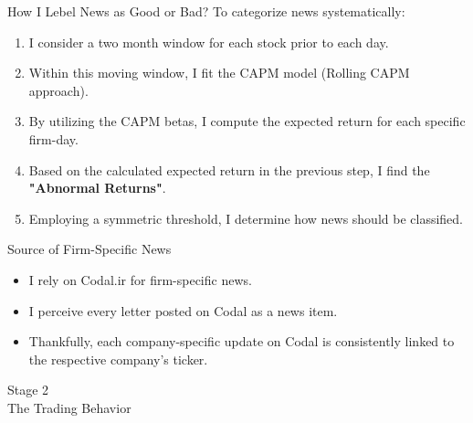 \documentclass{beamer}
\begin{document}
\begin{frame}{How I Lebel News as Good or Bad?}
    To categorize news systematically:
    \begin{enumerate}
        \item I consider a two month window for each stock prior to each day.
        \item Within this moving window, I fit the CAPM model (Rolling CAPM approach).
        \item By utilizing the CAPM betas, I compute the expected return for each specific firm-day.
        \item Based on the calculated expected return in the previous step, I find the \textbf{"Abnormal Returns"}.
        \item Employing a symmetric threshold, I determine how news should be classified.
    \end{enumerate}
\end{frame}

\begin{frame}{Source of Firm-Specific News}
    \begin{itemize}
        \item I rely on Codal.ir for firm-specific news.
        \item I perceive every letter posted on Codal as a news item.
        \item Thankfully, each company-specific update on Codal is consistently linked to the respective company's ticker.
    \end{itemize}
\end{frame}

\begin{frame}
    \Huge
    \center
    Stage 2
    \\
    The Trading Behavior
\end{frame}
\end{document}
